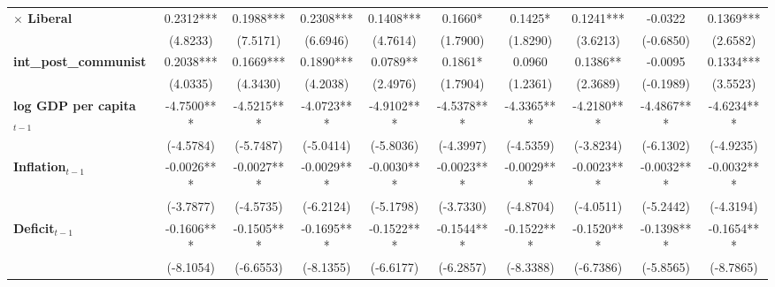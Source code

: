 \begin{center}
\begin{tabular}{lccccccccc}
\textbf{$\times$ Liberal}              &     0.2312***      &     0.1988***      &     0.2308***      &     0.1408***      &      0.1660*       &      0.1425*       &     0.1241***      &      -0.0322       &     0.1369***       \\
\textbf{ }                         &      (4.8233)      &      (7.5171)      &      (6.6946)      &      (4.7614)      &      (1.7900)      &      (1.8290)      &      (3.6213)      &     (-0.6850)      &      (2.6582)       \\
\textbf{int\_post\_communist}      &     0.2038***      &     0.1669***      &     0.1890***      &      0.0789**      &      0.1861*       &       0.0960       &      0.1386**      &      -0.0095       &     0.1334***       \\
\textbf{ }                         &      (4.0335)      &      (4.3430)      &      (4.2038)      &      (2.4976)      &      (1.7904)      &      (1.2361)      &      (2.3689)      &     (-0.1989)      &      (3.5523)       \\
\textbf{log GDP per capita$_{t-1}$}           &     -4.7500***     &     -4.5215***     &     -4.0723***     &     -4.9102***     &     -4.5378***     &     -4.3365***     &     -4.2180***     &     -4.4867***     &     -4.6234***      \\
\textbf{ }                         &     (-4.5784)      &     (-5.7487)      &     (-5.0414)      &     (-5.8036)      &     (-4.3997)      &     (-4.5359)      &     (-3.8234)      &     (-6.1302)      &     (-4.9235)       \\
\textbf{Inflation$_{t-1}$}      &     -0.0026***     &     -0.0027***     &     -0.0029***     &     -0.0030***     &     -0.0023***     &     -0.0029***     &     -0.0023***     &     -0.0032***     &     -0.0032***      \\
\textbf{ }                         &     (-3.7877)      &     (-4.5735)      &     (-6.2124)      &     (-5.1798)      &     (-3.7330)      &     (-4.8704)      &     (-4.0511)      &     (-5.2442)      &     (-4.3194)       \\
\textbf{Deficit$_{t-1}$}             &     -0.1606***     &     -0.1505***     &     -0.1695***     &     -0.1522***     &     -0.1544***     &     -0.1522***     &     -0.1520***     &     -0.1398***     &     -0.1654***      \\
\textbf{ }                         &     (-8.1054)      &     (-6.6553)      &     (-8.1355)      &     (-6.6177)      &     (-6.2857)      &     (-8.3388)      &     (-6.7386)      &     (-5.8565)      &     (-8.7865)       \\

\end{tabular}
\end{center}
